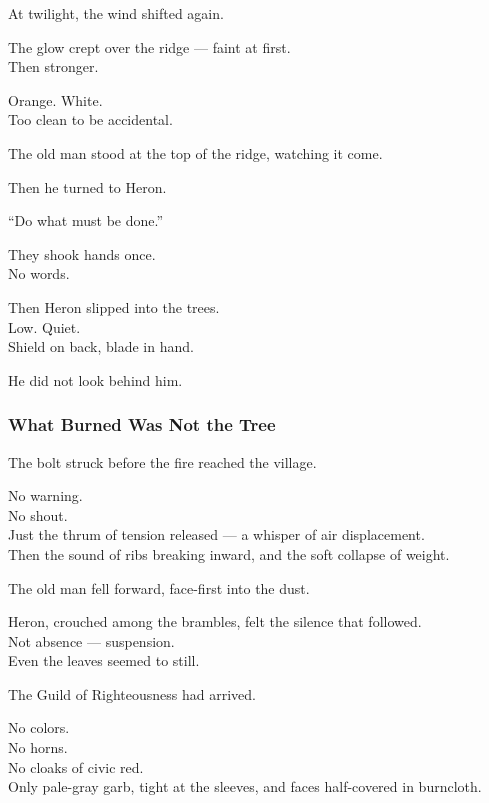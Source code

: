 \documentclass[12pt]{article}
\begin{document}
\vspace{1em}

At twilight, the wind shifted again.

The glow crept over the ridge — faint at first.\\
Then stronger.

Orange. White.\\
Too clean to be accidental.

The old man stood at the top of the ridge, watching it come.

Then he turned to Heron.

\vspace{1em}

“Do what must be done.”

\vspace{1em}

They shook hands once.\\
No words.

Then Heron slipped into the trees.\\
Low. Quiet.\\
Shield on back, blade in hand.

He did not look behind him.

\dotfill

\subsubsection*{What Burned Was Not the Tree}

The bolt struck before the fire reached the village.

No warning.\\
No shout.\\
Just the thrum of tension released — a whisper of air displacement.\\
Then the sound of ribs breaking inward, and the soft collapse of weight.

The old man fell forward, face-first into the dust.

Heron, crouched among the brambles, felt the silence that followed.\\
Not absence — suspension.\\
Even the leaves seemed to still.

\vspace{1em}

The Guild of Righteousness had arrived.

No colors.\\
No horns.\\
No cloaks of civic red.\\
Only pale-gray garb, tight at the sleeves, and faces half-covered in burncloth.
\end{document}
